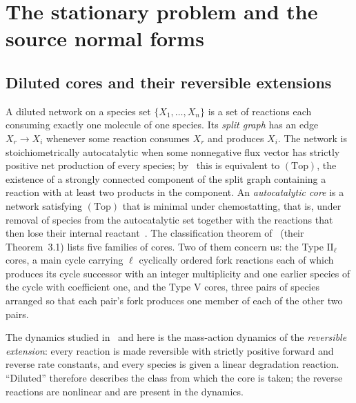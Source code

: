 \documentclass[11pt,a4paper]{article}
\theoremstyle{plain}
\theoremstyle{definition}
\theoremstyle{remark}
\numberwithin{equation}{section}
\newcommand{\II}{\mathrm{II}}
\newcommand{\V}{\mathrm{V}}
\newcommand{\Top}{\mathrm{(Top)}}
\begin{document}
\section{The stationary problem and the source normal forms}\label{sec:setting}

\subsection{Diluted cores and their reversible extensions}
A diluted network on a species set $\{X_1,\dots,X_n\}$ is a set of reactions each consuming exactly one molecule of one species. Its \emph{split graph} has an edge $X_r\to X_i$ whenever some reaction consumes $X_r$ and produces $X_i$. The network is stoichiometrically autocatalytic when some nonnegative flux vector has strictly positive net production of every species; by~\cite{UN22} this is equivalent to $\Top$, the existence of a strongly connected component of the split graph containing a reaction with at least two products in the component. An \emph{autocatalytic core} is a network satisfying $\Top$ that is minimal under chemostatting, that is, under removal of species from the autocatalytic set together with the reactions that then lose their internal reactant~\cite[\S2]{NNU26}. The classification theorem of~\cite{NNU26} (their Theorem~3.1) lists five families of cores. Two of them concern us: the Type $\II_\ell$ cores, a main cycle carrying $\ell$ cyclically ordered fork reactions each of which produces its cycle successor with an integer multiplicity and one earlier species of the cycle with coefficient one, and the Type $\V$ cores, three pairs of species arranged so that each pair's fork produces one member of each of the other two pairs.

The dynamics studied in~\cite{NNU26} and here is the mass-action dynamics of the \emph{reversible extension}: every reaction is made reversible with strictly positive forward and reverse rate constants, and every species is given a linear degradation reaction. ``Diluted'' therefore describes the class from which the core is taken; the reverse reactions are nonlinear and are present in the dynamics.
\end{document}
